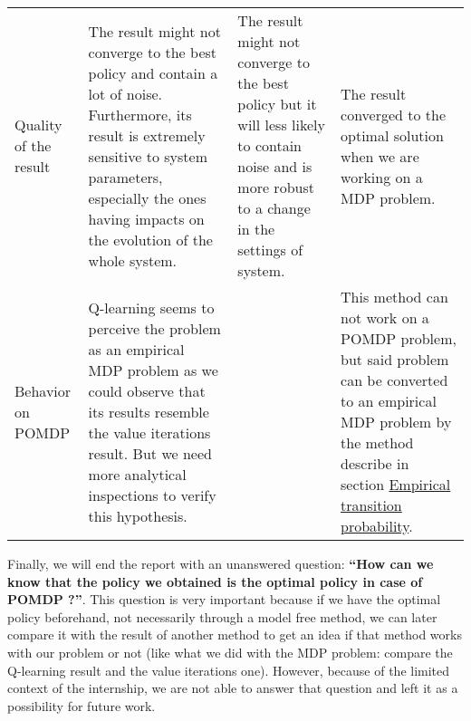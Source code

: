 \documentclass[
  a4paper, xcolor = usenames,dvipsnames]{article}
\theoremstyle{definition}
\theoremstyle{definition}
\theoremstyle{definition}
\theoremstyle{definition}
\theoremstyle{remark}
\begin{document}
\begin{longtable}[]{@{}llll@{}}
\begin{minipage}[t]{0.18\columnwidth}
Quality of the result\strut
\end{minipage} & \begin{minipage}[t]{0.35\columnwidth}\raggedright
The result might not converge to the best policy and contain a lot of noise. Furthermore, its result is extremely sensitive to system parameters, especially the ones having impacts on the evolution of the whole system.\strut
\end{minipage} & \begin{minipage}[t]{0.18\columnwidth}\raggedright
The result might not converge to the best policy but it will less likely to contain noise and is more robust to a change in the settings of system.\strut
\end{minipage} & \begin{minipage}[t]{0.18\columnwidth}\raggedright
The result converged to the optimal solution when we are working on a MDP problem.\strut
\end{minipage}\tabularnewline
\begin{minipage}[t]{0.18\columnwidth}\raggedright
Behavior on POMDP\strut
\end{minipage} & \begin{minipage}[t]{0.35\columnwidth}\raggedright
Q-learning seems to perceive the problem as an empirical MDP problem as we could observe that its results resemble the value iterations result. But we need more analytical inspections to verify this hypothesis.\strut
\end{minipage} & \begin{minipage}[t]{0.18\columnwidth}\raggedright
\strut
\end{minipage} & \begin{minipage}[t]{0.18\columnwidth}\raggedright
This method can not work on a POMDP problem, but said problem can be converted to an empirical MDP problem by the method describe in section \protect\hyperlink{empirical-transition-probability}{Empirical transition probability}.\strut
\end{minipage}\tabularnewline
\bottomrule
\end{longtable}

Finally, we will end the report with an unanswered question: \textbf{``How can we know that the policy we obtained is the optimal policy in case of POMDP ?''}. This question is very important because if we have the optimal policy beforehand, not necessarily through a model free method, we can later compare it with the result of another method to get an idea if that method works with our problem or not (like what we did with the MDP problem: compare the Q-learning result and the value iterations one). However, because of the limited context of the internship, we are not able to answer that question and left it as a possibility for future work.

\newpage

\printbibliography
\end{document}
